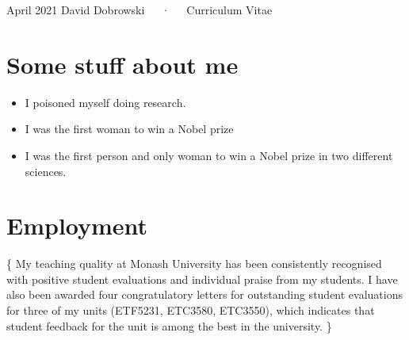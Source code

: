 \documentclass[11pt, a4paper]{awesome-cv}
\providecommand{\tightlist}{%
	\setlength{\itemsep}{0pt}\setlength{\parskip}{0pt}}
\begin{document}
\makecvheader

\makecvfooter
  {April 2021}
    {David Dobrowski~~~·~~~Curriculum Vitae}
  {\thepage}





\hypertarget{some-stuff-about-me}{%
\section{Some stuff about me}\label{some-stuff-about-me}}

\begin{itemize}
\tightlist
\item
  I poisoned myself doing research.
\item
  I was the first woman to win a Nobel prize
\item
  I was the first person and only woman to win a Nobel prize in two
  different sciences.
\end{itemize}

\hypertarget{employment}{%
\section{Employment}\label{employment}}

\footnotesize\{ My teaching quality at Monash University has been
consistently recognised with positive student evaluations and individual
praise from my students. I have also been awarded four congratulatory
letters for outstanding student evaluations for three of my units
(ETF5231, ETC3580, ETC3550), which indicates that student feedback for
the unit is among the best in the university. \}

\begin{cventries}
    \vspace{-4.0mm}
    \vspace{-4.0mm}
    \vspace{-4.0mm}
    \vspace{-4.0mm}
    \vspace{-4.0mm}
\end{cventries}
\end{document}
